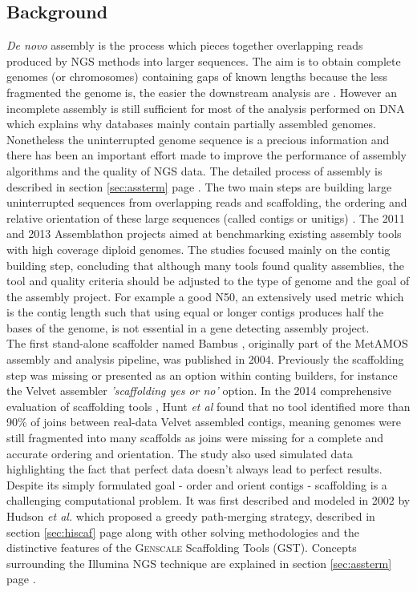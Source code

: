 \documentclass[12pt]{article}
\newcommand*{\fulleref}[1]{section \hyperref[{#1}] {\ref*{#1}} page {\pageref{#1}}}%
\begin{document}
\subsection{Background}
\textit{De novo} assembly is the process which pieces together overlapping reads produced by NGS methods into larger sequences. The aim is to obtain complete genomes (or chromosomes) containing gaps of known lengths because the less fragmented the genome is, the easier the downstream analysis are \cite{hunt_comprehensive_2014}. However an incomplete assembly is still sufficient for most of the analysis performed on DNA which explains why databases mainly contain partially assembled genomes. Nonetheless the uninterrupted genome sequence is a precious information and there has been an important effort made to improve the performance of assembly algorithms and the quality of NGS data. The detailed process of assembly is described in \fulleref{sec:assterm}. The two main steps are building large uninterrupted sequences from overlapping reads and scaffolding, the ordering and relative orientation of these large sequences (called contigs or unitigs) . The 2011 and 2013 Assemblathon projects \cite{earl_assemblathon_2011} \cite{bradnam_assemblathon_2013} aimed at  benchmarking existing assembly tools with high coverage diploid genomes. The studies focused mainly on the contig building step, concluding that although many tools found quality assemblies, the tool and quality criteria should be adjusted to the type of genome and the goal of the assembly project. For example a good N50, an extensively used metric which is the contig length such that using equal or longer contigs produces half the bases of the genome, is not essential in a gene detecting assembly project. \\
The first stand-alone scaffolder named Bambus \cite{pop_hierarchical_2004}, originally part of the MetAMOS \cite{treangen_metamos:_2013} assembly and analysis pipeline, was published in 2004. Previously the scaffolding step was missing or presented as an option within conting builders, for instance the Velvet\cite{zerbino_velvet:_2008} assembler \textit{'scaffolding yes or no'} option. In the 2014 comprehensive evaluation of scaffolding tools \cite{hunt_comprehensive_2014-1}, Hunt \textit{et al} found that no tool identified more than 90\% of joins between real-data Velvet assembled contigs, meaning genomes were still fragmented into many scaffolds as joins were missing for a complete and accurate ordering and orientation. The study also used simulated data highlighting the fact that perfect data doesn't always lead to perfect results. Despite its simply formulated goal - order and orient contigs - scaffolding is a challenging computational problem. It was first described and modeled in 2002 by Hudson \textit{et al.}\cite{huson_greedy_2002} which proposed a greedy path-merging strategy, described in \fulleref{sec:hiscaf} along with other solving methodologies and the distinctive features of the \textsc{Genscale} Scaffolding Tools \cite{ipetrov_2014} (GST). Concepts surrounding the Illumina NGS technique are explained in \fulleref{sec:assterm}.
\end{document}
